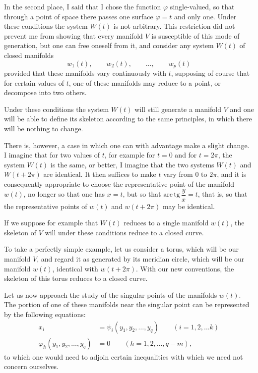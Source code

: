 \documentclass{article}
\begin{document}
In the second place, I said that I chose the function $\varphi$ single-valued, so that through a point of space there passes one surface $\varphi = t$ and only one. Under these conditions the system $W(t)$ is not arbitrary. This restriction did not prevent me from showing that every manifold $V$ is susceptible of this mode of generation, but one can free oneself from it, and consider any system $W(t)$ of closed manifolds
\[ w_{1}(t), \qquad w_{2}(t), \qquad \ldots, \qquad w_{p}(t) \]
provided that these manifolds vary continuously with $t$, supposing of course that for certain values of $t$, one of these manifolds may reduce to a point, or decompose into two others.

Under these conditions the system $W(t)$ will still generate a manifold $V$ and one will be able to define its skeleton according to the same principles, in which there will be nothing to change.

There is, however, a case in which one can with advantage make a slight change. I imagine that for two values of $t$, for example for $t = 0$ and for $t = 2\pi$, the system $W(t)$ is the same, or better, I imagine that the two systems $W(t)$ and $W(t + 2\pi)$ are identical. It then suffices to make $t$ vary from 0 to $2\pi$, and it is consequently appropriate to choose the representative point of the manifold $w(t)$, no longer so that one has $x = t$, but so that $\mathrm{arc\,tg}\,\dfrac{y}{x} = t$, that is, so that the representative points of $w(t)$ and $w(t + 2\pi)$ may be identical.

If we suppose for example that $W(t)$ reduces to a single manifold $w(t)$, the skeleton of $V$ will under these conditions reduce to a closed curve.


To take a perfectly simple example, let us consider a torus, which will be our manifold $V$, and regard it as generated by its meridian circle, which will be our manifold $w(t)$, identical with $w(t + 2\pi)$. With our new conventions, the skeleton of this torus reduces to a closed curve.

Let us now approach the study of the singular points of the manifolds $w(t)$. The portion of one of these manifolds near the singular point can be represented by the following equations:
\[ \begin{aligned} x_{i} &= \psi_{i}(y_{1}, y_{2}, \ldots, y_{q}) \qquad (i = 1, 2, \ldots k)\\ \varphi_{h}(y_{1}, y_{2}, \ldots, y_{q}) &= 0 \qquad (h = 1, 2, \ldots, q - m), \end{aligned} \]
to which one would need to adjoin certain inequalities with which we need not concern ourselves.
\end{document}
